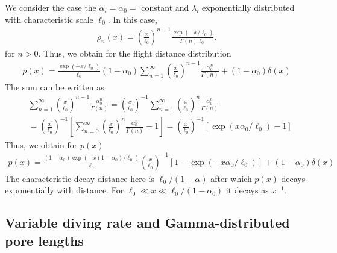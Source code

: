 \documentclass[singlecolumn,pre,notitlepage,preprintnumbers,floatfix,superscriptaddress]{revtex4-1}
\begin{document}
We consider the case the $\alpha_i = \alpha_0 = $ constant and $\lambda_i$ exponentially distributed with characteristic scale $\ell_0$. In this case,
%
\begin{align}
\rho_n(x) = \left(\frac{x}{\ell_0}\right)^{n-1}
\frac{\exp(-x/\ell_0)}{\Gamma(n) \ell_0}. 
\end{align}
%
for $n > 0$. Thus, we obtain for the flight distance distribution
%
\begin{align}
p(x) = \frac{\exp(-x/\ell_0)}{\ell_0}(1 - \alpha_{0})  \sum\limits_{n =
  1}^\infty \left(\frac{x}{\ell_0}\right)^{n-1}
\frac{\alpha_0^{n}}{\Gamma(n)} + (1 - \alpha_0) \delta(x)
\end{align}
%
The sum can be written as 
%
\begin{align}
& \sum\limits_{n = 1}^\infty \left(\frac{x}{\ell_0}\right)^{n-1}
\frac{\alpha_0^{n}}{\Gamma(n)} = \left(\frac{x}{\ell_0}\right)^{-1} \sum\limits_{n =
  1}^\infty \left(\frac{x}{\ell_0}\right)^{n}
\frac{\alpha_0^{n}}{\Gamma(n)}
\\
&= \left(\frac{x}{\ell_0}\right)^{-1} \left[\sum\limits_{n =
  0}^\infty \left(\frac{x}{\ell_0}\right)^{n}
\frac{\alpha_0^{n}}{\Gamma(n)} - 1\right] = \left(\frac{x}{\ell_0}\right)^{-1} \left[\exp(x\alpha_0/\ell_0) - 1\right]
\end{align}
%
Thus, we obtain for $p(x)$
%
\begin{align}
p(x) = \frac{(1 - \alpha_{0})\exp(- x(1 - \alpha_0)/\ell_0)}{\ell_0}
\left(\frac{x}{\ell_0}\right)^{-1} \left[1 - \exp(-x \alpha_0/\ell_0)\right]
+ (1 - \alpha_0) \delta(x)
\end{align}
%
The characteristic decay distance here is $\ell_0/(1 - \alpha)$ after which $p(x)$ decays exponentially with distance. For $\ell_0 \ll x \ll \ell_0/(1 - \alpha_0)$ it decays as $x^{-1}$. 

\subsection{Variable diving rate and Gamma-distributed pore lengths}
\end{document}
